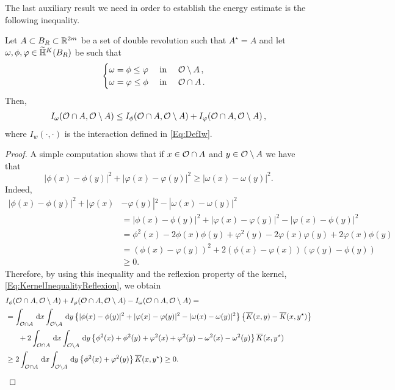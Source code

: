 The last auxiliary result we need in order to establish the energy estimate is the following inequality.

\begin{lemma}
\label{Lemma: InteractionInequalityMinimumFunction}
Let $A\subset B_R \subset \mathbb{R}^{2m}$ be a set of double revolution such that $A^\star = A$ and let $\omega, \phi, \varphi \in \widetilde{\mathbb{H}}^K(B_R)$ be such that
$$\begin{cases}
\omega = \phi \leq \varphi \ \ \ \ \textrm{in } \ \ \ \mathcal{O} \setminus A\,,\\
\omega = \varphi \leq \phi \ \ \ \ \textrm{in } \ \ \ \mathcal{O} \cap A\,.
\end{cases}$$
Then,
\begin{align*}
I_\omega(\mathcal{O}\cap A, \mathcal{O} \setminus A) \leq I_\phi(\mathcal{O}\cap A, \mathcal{O} \setminus A) + I_\varphi(\mathcal{O}\cap A, \mathcal{O} \setminus A)\,,
\end{align*}
where $I_w(\cdot, \cdot)$ is the interaction defined in \eqref{Eq:DefIw}.
\end{lemma}

\begin{proof}
A simple computation shows that if $x\in \mathcal{O} \cap A$ and $y\in \mathcal{O} \setminus A$ we have that
$$ |\phi(x)-\phi(y)|^2+|\varphi(x)-\varphi(y)|^2\geq |\omega(x)-\omega(y)|^2. $$
Indeed,
\begin{align*}
|\phi(x)-\phi(y)|^2+|\varphi(x)&-\varphi(y)|^2 - |\omega(x)-\omega(y)|^2 \\
&= |\phi(x)-\phi(y)|^2+|\varphi(x)-\varphi(y)|^2 - |\varphi(x)-\phi(y)|^2 \\
&= \phi^2(x)-2\phi(x)\phi(y)+\varphi^2(y)-2\varphi(x)\varphi(y)+2\varphi(x)\phi(y) \\
&= \left( \phi(x) - \varphi(y)\right) ^2+2\left( \phi(x)-\varphi(x) \right) \left( \varphi(y)-\phi(y) \right) \\
&\geq 0.
\end{align*}
Therefore, by using this inequality and the reflexion property of the kernel, \eqref{Eq:KernelInequalityReflexion}, we obtain
\begin{align*}
I_\phi(\ocal\cap A, \ocal \setminus A) &+ I_\varphi(\ocal\cap A, \ocal \setminus A) - I_\omega(\ocal\cap A, \ocal \setminus A) = \\
&\hspace{-26mm}= \int_{\ocal\cap A} \d x \int_{\ocal\setminus A} \d y \left\{|\phi(x)-\phi(y)|^2+|\varphi(x)-\varphi(y)|^2-|\omega(x)-\omega(y)|^2 \right\} \left\{\overline{K}(x,y)-\overline{K}(x,y^\star)\right\} \\
&\hspace{-20mm}+ 2 \int_{\ocal\cap A} \d x \int_{\ocal\setminus A} \d y \left\{\phi^2(x)+\phi^2(y)+\varphi^2(x)+\varphi^2(y)-\omega^2(x)-\omega^2(y) \right\} \overline{K}(x,y^\star) \\
&\hspace{-26mm}\geq 2\int_{\ocal\cap A} \d x \int_{\ocal\setminus A} \d y \left\{
\phi^2(x)+\varphi^2(y)\right\} \overline{K}(x,y^\star) \geq 0.
\end{align*}
\end{proof}




